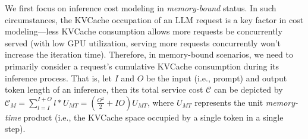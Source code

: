 

We first focus on inference cost modeling in \emph{memory-bound} status.
In such circumstances, the KVCache occupation of an LLM request is a key factor in cost modeling---less KVCache consumption allows more requests be concurrently served (with low GPU utilization, serving more requests concurrently won't increase the iteration time). 
Therefore, in memory-bound scenarios, we need to primarily consider a request's cumulative KVCache consumption during its inference process.
That is, let $I$ and $O$ be the input (i.e., prompt) and output token length of an inference, then its total service cost $\mathcal{C}$ can be depicted by $\mathcal{C}_M=\sum_{l=I}^{I+O}l*U_{MT}=(\frac{O^2}{2}+IO)U_{MT}$, where $U_{MT}$ represents the unit \emph{memory-time} product (i.e., the KVCache space occupied by a single token in a single step). 


